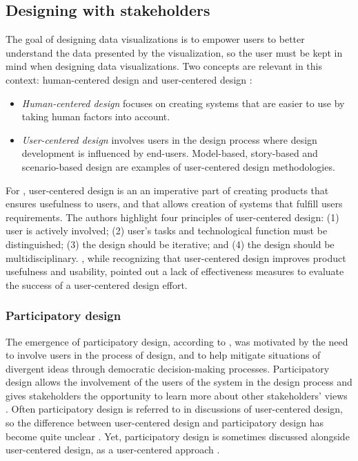 \documentclass[preprint,12pt]{elsarticle}
\begin{document}
\subsection{Designing with stakeholders}
The goal of designing data visualizations is to empower users to better understand the data presented by the visualization, so the user must be kept in mind when designing data visualizations. Two concepts are relevant in this context: human-centered design and user-centered design :
\begin{itemize}
    \item \textit{Human-centered design} focuses on creating systems that are easier to use by taking human factors into account.
    \item \textit{User-centered design} involves users in the design process where design development is influenced by end-users. Model-based, story-based and scenario-based design are examples of user-centered design methodologies. 
\end{itemize}

For \citet{vilpola2008method}, user-centered design is an an imperative part of creating products that ensures usefulness to users, and that allows creation of systems that fulfill users requirements. The authors highlight four principles of user-centered design: (1) user is actively involved; (2) user's tasks and technological function must be distinguished; (3) the design should be iterative; and (4) the design should be multidisciplinary. 
\citet{vredenberg2001user}, while recognizing that user-centered design improves product usefulness and usability, pointed out a lack of effectiveness measures to evaluate the success of a user-centered design effort.

\subsubsection{Participatory design}
The emergence of participatory design, according to \citet{bannon2018introduction}, was motivated by the need to involve users in the process of design, and to help mitigate situations of divergent ideas through democratic decision-making processes. Participatory design allows the involvement of the users of the system in the design process and gives stakeholders the opportunity to learn more about other stakeholders' views \cite{unger2013designing}.
Often participatory design is referred to in discussions of user-centered design, so the difference between user-centered design and participatory design has become quite unclear \cite{bannon2018introduction}. Yet, participatory design is sometimes discussed alongside user-centered design, as a user-centered approach \cite{leng2018designing}.
\end{document}
